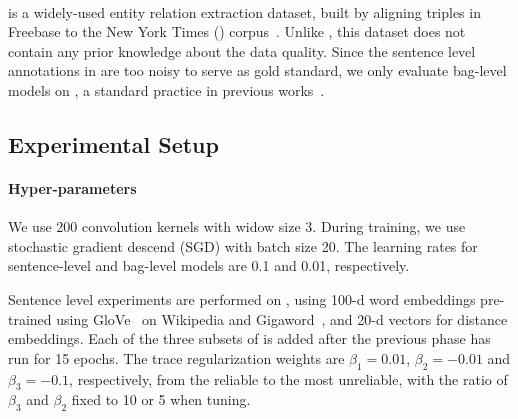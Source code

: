 \paragraph{\EntityRE} is a widely-used entity
relation extraction dataset, built %
by aligning triples
in Freebase to the New York Times (\NYT) corpus~\cite{riedel2010modeling}. 
Unlike \TimeRE, this dataset does not contain any prior knowledge about the data quality.
Since the sentence level annotations in %
 \EntityRE are too noisy to serve as gold standard,  we only evaluate bag-level models on \EntityRE, a standard practice in previous works~\cite{surdeanu2012multi,zeng2015distant,lin2016neural}.


\subsection{Experimental Setup}
%
%
\paragraph{Hyper-parameters}
We use 200 convolution kernels with widow size 3. During training, we use stochastic gradient descend (SGD) with batch size 20.  The learning rates for sentence-level  and bag-level models are 0.1 and 0.01, respectively.
%
%

Sentence level experiments are performed on \TimeRE, 
using %
100-d word embeddings pre-trained using GloVe~\cite{pennington2014glove} on Wikipedia and Gigaword~\cite{parker2011english}, 
and 20-d vectors for distance embeddings. Each of the three subsets of \TimeRE is added after the previous phase has run for 15 epochs. The trace regularization weights are $\beta_1=0.01$, $\beta_2=-0.01$ and $\beta_3=-0.1$, respectively, from the reliable to the most unreliable, with the ratio of $\beta_3$ and $\beta_2$ fixed to 10 or 5 when tuning.

